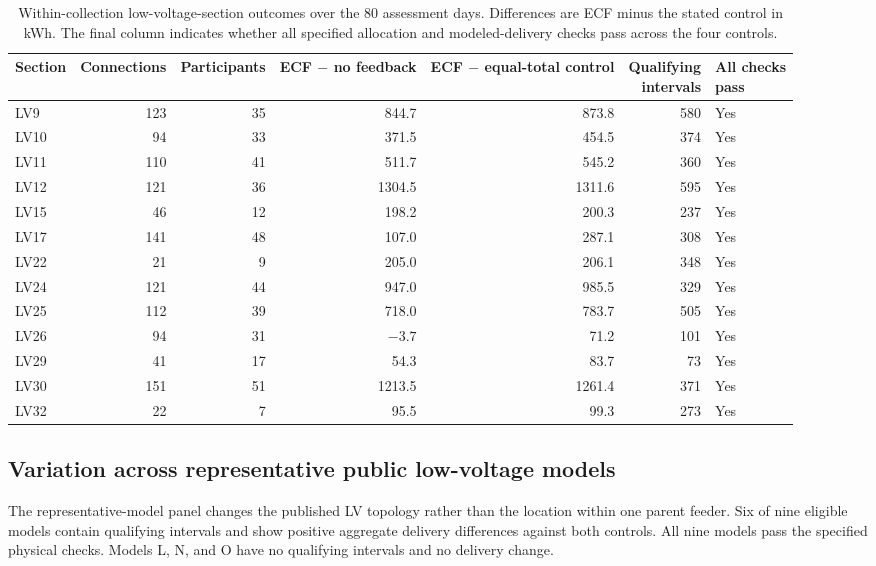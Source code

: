 \documentclass[11pt]{article}
\begin{document}
\begin{table}[!ht]
\centering
\caption{Within-collection low-voltage-section outcomes over the 80 assessment
days. Differences are ECF minus the stated control in kWh. The final column
indicates whether all specified allocation and modeled-delivery checks pass
across the four controls.}
\label{tab:supp_au_lv_sections}
\scriptsize
\setlength{\tabcolsep}{3.1pt}
\begin{tabular}{@{}lrrrrrl@{}}
\toprule
Section & Connections & Participants & \shortstack{ECF $-$ no\\feedback} & \shortstack{ECF $-$ equal-total\\control} & \shortstack{Qualifying\\intervals} & \shortstack{All checks\\pass} \\
\midrule
LV9 & 123 & 35 & 844.7 & 873.8 & 580 & Yes \\
LV10 & 94 & 33 & 371.5 & 454.5 & 374 & Yes \\
LV11 & 110 & 41 & 511.7 & 545.2 & 360 & Yes \\
LV12 & 121 & 36 & 1304.5 & 1311.6 & 595 & Yes \\
LV15 & 46 & 12 & 198.2 & 200.3 & 237 & Yes \\
LV17 & 141 & 48 & 107.0 & 287.1 & 308 & Yes \\
LV22 & 21 & 9 & 205.0 & 206.1 & 348 & Yes \\
LV24 & 121 & 44 & 947.0 & 985.5 & 329 & Yes \\
LV25 & 112 & 39 & 718.0 & 783.7 & 505 & Yes \\
LV26 & 94 & 31 & $-3.7$ & 71.2 & 101 & Yes \\
LV29 & 41 & 17 & 54.3 & 83.7 & 73 & Yes \\
LV30 & 151 & 51 & 1213.5 & 1261.4 & 371 & Yes \\
LV32 & 22 & 7 & 95.5 & 99.3 & 273 & Yes \\
\bottomrule
\end{tabular}
\end{table}

\subsection{Variation across representative public low-voltage models}
\label{supp:au_topologies}

The representative-model panel changes the published LV topology rather than
the location within one parent feeder. Six of nine eligible models contain
qualifying intervals and show positive aggregate delivery differences against
both controls. All nine models pass the specified physical checks. Models L,
N, and O have no qualifying intervals and no delivery change.
\end{document}
